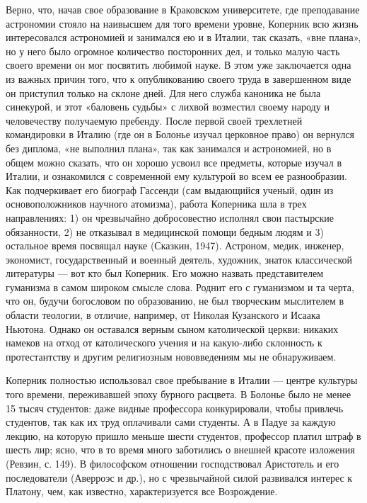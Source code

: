 Верно,  что, начав  свое  образование в  Краковском университете,  где
преподавание астрономии  стояло на наивысшем для  того времени уровне,
Коперник  всю  жизнь интересовался  астрономией  и  занимался ею  и  в
Италии, так сказать,  «вне плана», но у него  было огромное количество
посторонних дел, и только малую  часть своего времени он мог посвятить
любимой науке. В этом уже заключается  одна из важных причин того, что
к опубликованию своего труда в завершенном виде он приступил только на
склоне  дней. Для  него  служба  каноника не  была  синекурой, и  этот
«баловень  судьбы» с  лихвой  возместил своему  народу и  человечеству
получаемую  пребенду. После  первой  своей  трехлетней командировки  в
Италию  (где он  в Болонье  изучал  церковное право)  он вернулся  без
диплома, «не  выполнил плана», так  как занимался и астрономией,  но в
общем  можно  сказать, что  он  хорошо  усвоил все  предметы,  которые
изучал  в  Италии,  и  ознакомился  с  современной  ему  культурой  во
всем  ее  разнообразии. Как  подчеркивает  его  биограф Гассенди  (сам
выдающийся ученый, один из основоположников научного атомизма), работа
Коперника  шла в  трех направлениях:  1) он  чрезвычайно добросовестно
исполнял свои  пастырские обязанности,  2) не отказывал  в медицинской
помощи  бедным людям  и 3)  остальное время  посвящал науке  (Сказкин,
1947). Астроном, медик, инженер,  экономист, государственный и военный
деятель,  художник, знаток  классической  литературы ---  вот кто  был
Коперник. Его  можно назвать представителем гуманизма  в самом широком
смысле  слова. Роднит  его с  гуманизмом и  та черта,  что он,  будучи
богословом  по образованию,  не  был творческим  мыслителем в  области
теологии, в отличие, например, от Николая Кузанского и Исаака Ньютона.
Однако он оставался верным  сыном католической церкви: никаких намеков
на  отход  от  католического  учения  и  на  какую-либо  склонность  к
протестантству и другим религиозным нововведениям мы не обнаруживаем.

Коперник  полностью использовал  свое пребывание  в Италии  --- центре
культуры  того   времени,  переживавшей  эпоху  бурного   расцвета.  В
Болонье  было не  менее  15 тысяч  студентов:  даже видные  профессора
конкурировали, чтобы  привлечь студентов,  так как их  труд оплачивали
сами студенты.  А в Падуе за  каждую лекцию, на которую  пришло меньше
шести студентов,  профессор платил штраф в  шесть лир; ясно, что  в то
время много заботились о внешней красоте изложения (Ревзин, с. 149). В
философском  отношении господствовал  Аристотель  и его  последователи
(Аверроэс  и  др.),  но  с чрезвычайной  силой  развивался  интерес  к
Платону, чем, как известно, характеризуется все Возрождение.

